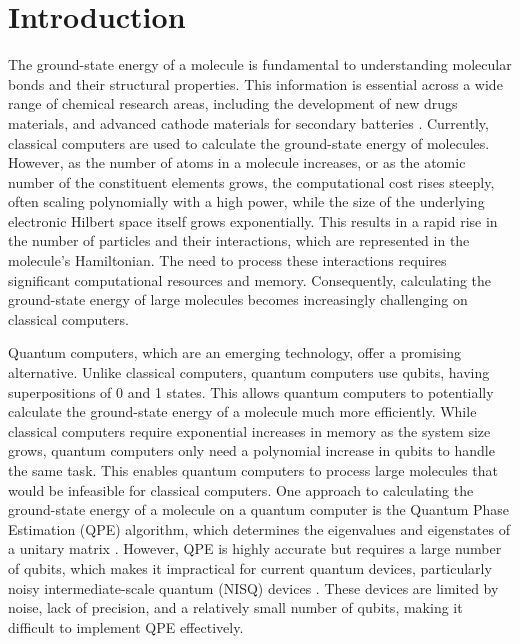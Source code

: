 \documentclass[pdflatex,sn-mathphys-num]{sn-jnl}%
\theoremstyle{thmstyleone}%
\theoremstyle{thmstyletwo}%
\theoremstyle{thmstylethree}%
\begin{document}
\section{Introduction}\label{sec1}
The ground-state energy of a molecule is fundamental to understanding molecular bonds and their structural properties. 
This information is essential across a wide range of chemical research areas, including the development of new drugs materials\cite{RN66,RN69}, and advanced cathode materials for secondary batteries \cite{RN117,RN118,RN75}. 
Currently, classical computers are used to calculate the ground-state energy of molecules.
However, as the number of atoms in a molecule increases, or as the atomic number of the constituent elements grows, the computational cost rises steeply, often scaling polynomially with a high power, while the size of the underlying electronic Hilbert space itself grows exponentially.
This results in a rapid rise in the number of particles and their interactions, which are represented in the molecule’s Hamiltonian. 
The need to process these interactions requires significant computational resources and memory. 
Consequently, calculating the ground-state energy of large molecules becomes increasingly challenging on classical computers.

Quantum computers, which are an emerging technology, offer a promising alternative. Unlike classical computers, quantum computers use qubits, having superpositions of 0 and 1 states. 
This allows quantum computers to potentially calculate the ground-state energy of a molecule much more efficiently. 
While classical computers require exponential increases in memory as the system size grows, quantum computers only need a polynomial increase in qubits to handle the same task. 
This enables quantum computers to process large molecules that would be infeasible for classical computers.
One approach to calculating the ground-state energy of a molecule on a quantum computer is the Quantum Phase Estimation (QPE) algorithm, which determines the eigenvalues and eigenstates of a unitary matrix \cite{QPE1,QPE2,QPE3,QPE4,QPE5}. 
However, QPE is highly accurate but requires a large number of qubits, which makes it impractical for current quantum devices, particularly noisy intermediate-scale quantum (NISQ) devices \cite{NISQ1}. 
These devices are limited by noise, lack of precision, and a relatively small number of qubits, making it difficult to implement QPE effectively.
\end{document}

